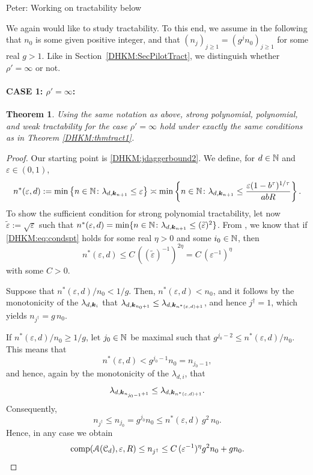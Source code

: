 \documentclass[USenglish]{article}
\theoremstyle{dgthm}
\newtheorem{theorem}{Theorem}
\theoremstyle{dgthm}
\theoremstyle{dgthm}
\theoremstyle{dgthm}
\theoremstyle{dgdef}
\theoremstyle{definition}
\newcommand{\PeterNote}[1]{{\color{orange}Peter: #1}}
\begin{document}
\PeterNote{Working on tractability below

\medskip

We again would like to study tractability. To this end, we assume in the following that $n_0$ is some given positive integer, and that $(n_j)_{j\ge 1}=(g^j n_0)_{j\ge 1}$ for some real $g>1$. Like in Section~\ref{DHKM:SecPilotTract}, we distinguish whether $\rho'=\infty$ or not. 

\paragraph*{CASE 1: $\rho'=\infty$:}

\begin{theorem} \label{DHKM:thmtract3}
Using the same notation as above, strong polynomial, polynomial, and weak tractability for the case $\rho'=\infty$ hold under exactly the 
same conditions as in Theorem \ref{DHKM:thmtract1}.
\end{theorem}
\begin{proof}
Our starting point is \eqref{DHKM:jdaggerbound2}.
 We define, for $d\in{\mathbb{N}}$ and $\varepsilon\in (0,1)$,
 \[
  n^*(\varepsilon,d):=\min\left\{n\in{\mathbb{N}}\colon \lambda_{d,{\boldsymbol{k}}_{n+1}}\leq \varepsilon\right\}\asymp
  \min\left\{n\in{\mathbb{N}}\colon \lambda_{d,{\boldsymbol{k}}_{n+1}}\leq \frac{\varepsilon (1-b^\tau)^{1/\tau}}{abR}\right\}.
 \]
 To show the sufficient condition for strong polynomial tractability, let now $\widetilde{\varepsilon}:=\sqrt{\varepsilon}$ such that $n^*(\varepsilon,d)=\min\{n\in{\mathbb{N}}\colon \lambda_{d,{\boldsymbol{k}}_{n+1}}\leq (\widetilde{\varepsilon})^2 \}$. From \cite{NovWoz08a}, we know that if \eqref{DHKM:eq:condspt} holds for some real $\eta>0$ and some $i_0\in{\mathbb{N}}$, then 
 \[
  n^* (\varepsilon,d) \le C\,((\widetilde{\varepsilon})^{-1})^{2\eta}= C\, (\varepsilon^{-1})^\eta 
 \]
 with some $C>0$.
 
 Suppose that $n^*(\varepsilon,d) /n_0 < 1/g$. Then, $n^*(\varepsilon,d) < n_0$, and it follows by the monotonicity of the $\lambda_{d,{\boldsymbol{k}}_i}$ that
 $\lambda_{d,{\boldsymbol{k}}_{n_0+1}}\leq \lambda_{d,{\boldsymbol{k}}_{n^*(\varepsilon,d)+1}}$, and hence $j^\dagger =1$, which yields $n_{j^\dagger}=g\,n_0$. 
 
 If $n^*(\varepsilon,d) /n_0 \ge 1/g$, let $j_0\in {\mathbb{N}}$ be maximal such that $g^{j_0-2}\le n^*(\varepsilon,d) /n_0$. This means that 
 \[
 n^*(\varepsilon,d)  < g^{j_0-1} n_0=n_{j_0-1},
 \] 
 and hence, again by the monotonicity of the $\lambda_{d,i}$, that 
 \[
 \lambda_{d,{\boldsymbol{k}}_{n_{j_0-1}+1}}\leq \lambda_{d,{\boldsymbol{k}}_{n^*(\varepsilon,d)+1}}.
 \] 
 Consequently, 
 \[
 n_{j^\dagger} \le n_{j_0}=g^{j_0} n_0 \le 
 n^*(\varepsilon,d)\, g^2\,n_0.
 \]
 Hence, in any case we obtain
 \[
  \textup{comp} ({\mathcal{A}} ({\mathcal{C}}_d),\varepsilon,R) \leq n_{j^\dagger} \leq 
  C\, (\varepsilon^{-1})^\eta g^2 n_0+ gn_0.
 \]
 

\end{proof}}
\end{document}
